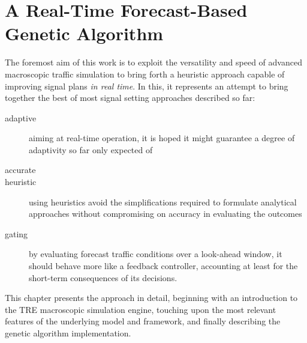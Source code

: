 \chapter{A Real-Time Forecast-Based Genetic Algorithm}

The foremost aim of this work is to exploit the versatility and speed of advanced macroscopic traffic simulation to bring forth a heuristic approach capable of improving signal plans \emph{in real time}.
In this, it represents an attempt to bring together the best of most signal setting approaches described so far:
\begin{description}
\item[adaptive] aiming at real-time operation, it is hoped it might guarantee a degree of adaptivity so far only expected of 
\item[accurate] 
\item[heuristic] using heuristics avoid the simplifications required to formulate analytical approaches without compromising on accuracy in evaluating the outcomes
\item[gating] by evaluating forecast traffic conditions over a look-ahead window, it should behave more like a feedback controller, accounting at least for the short-term consequences of its decisions.
\end{description}

This chapter presents the approach in detail, beginning with an introduction to the TRE macroscopic simulation engine, touching upon the most relevant features of the underlying model and framework, and finally describing the genetic algorithm implementation.






